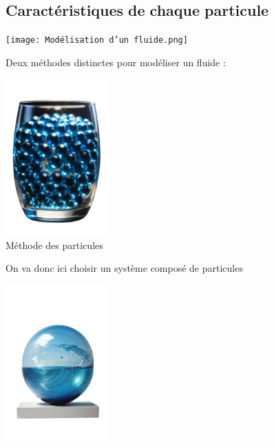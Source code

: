 \documentclass{article}
\begin{document}
\subsection{Caractéristiques\,\,de\,\,chaque\,\,particule}
\begin{center}
    \texttt{[image: Modélisation d'un fluide.png]}
\end{center}



\newpage
\thispagestyle{landscape}

\begin{center}
    Deux méthodes distinctes pour modéliser un fluide : 
\end{center}
\parbox{0.5\textwidth}{
    \centering
    \includegraphics[width=0.3\textwidth]{verre_particule.png}
    \\Méthode des particules
}
\vspace{\fill}

\newpage
\vspace*{2pt}
\thispagestyle{landscape}
On va donc ici choisir un système composé de particules
\vspace*{\fill}
\parbox{0.7\textwidth}{
}
\parbox{0.3\textwidth}{
    \includegraphics[width=0.3\textwidth]{particule}
    \vspace*{\fill}
}
\end{document}

